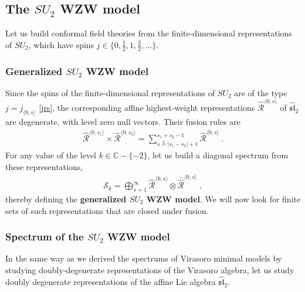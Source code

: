 \documentclass[12pt, a4paper, notitlepage, twoside]{report}
\numberwithin{equation}{section}
\theoremstyle{break}
\begin{document}
\subsection{The \texorpdfstring{$SU_2$}{SU(2)} WZW model \label{secsu}}

Let us build conformal field theories from the finite-dimensional representations of $SU_2$, which have spins $j\in\{0,\frac12,1,\frac32,\dots\}$.

\subsubsection{Generalized $SU_2$ WZW model}

Since the spins of the finite-dimensional representations of $SU_2$ are of the type $j=j_{\langle 0,s\rangle}$ \eqref{jrs}, the 
corresponding affine highest-weight representations $\hat{\mathcal{R}}^{\langle 0,s\rangle}$ of $\widehat{\mathfrak{sl}}_2$ are degenerate, with level zero null vectors.
Their fusion rules are 
\begin{align}
 \hat{\mathcal{R}}^{\langle 0, s_1\rangle}\times\hat{\mathcal{R}}^{\langle 0, s_2\rangle} = \sum_{s\overset{2}{=}|s_1-s_2|+1}^{s_1+s_2-1} \hat{\mathcal{R}}^{\langle 0, s\rangle}\ .
\end{align}
For any value of the level $k\in\mathbb{C}-\{-2\}$, let us build a diagonal spectrum from these representations,
\begin{align}
 \mathcal{S}_k = \bigoplus_{s=1}^\infty \hat{\mathcal{R}}^{\langle 0, s\rangle}\otimes \bar{\hat{\mathcal{R}}}^{\langle 0, s\rangle}\ ,
\end{align}
thereby defining the \textbf{\boldmath generalized $SU_2$ WZW model}. 
We will now look for finite sets of such representations that are closed under fusion.

\subsubsection{Spectrum of the $SU_2$ WZW model}

In the same way as we derived the spectrums of Virasoro minimal models by studying doubly-degenerate representations of the Virasoro algebra, let us study doubly degenerate representations of the affine Lie algebra $\widehat{\mathfrak{sl}}_2$. 
\end{document}
